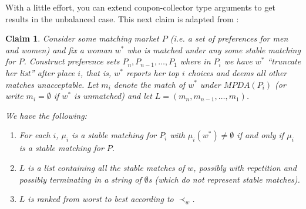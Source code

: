 \documentclass[12pt]{article}
\newtheorem{claim}[definition]{Claim}
\begin{document}
  With a little effort, you can extend coupon-collector type arguments to
  get results in the unbalanced case.
  This next claim is adapted from \cite{ImmorlicaHonestyStability05}:
  \begin{claim}
    Consider some matching market $P$ (i.e. a set of preferences
    for men and women) and fix a woman $w^*$ who is matched under any some
    stable matching for $P$.
    Construct preference sets $P_n, P_{n-1}, \ldots, P_1$
    where in $P_i$ we have $w^*$ ``truncate her list'' after place $i$,
    that is, $w^*$ reports her top $i$ choices and deems all other matches
    unacceptable. Let $m_i$ denote the match of $w^*$
    under $MPDA(P_i)$ (or write $m_i = \emptyset$ if $w^*$ is unmatched)
    and let $L = (m_n, m_{n-1}, \ldots, m_1)$.

    We have the following:
    \begin{enumerate}
      \item For each $i$, $\mu_i$ is a stable matching for $P_i$
        with $\mu_i(w^*)\ne \emptyset$
        if and only if $\mu_i$ is a stable matching for $P$.
      \item $L$ is a list containing all the stable matches of $w$,
        possibly with repetition and possibly terminating in a string of
        $\emptyset$s (which do not represent stable matches).
      \item $L$ is ranked from worst to best according to $\prec_w$.
    \end{enumerate}
  \end{claim}
\end{document}
